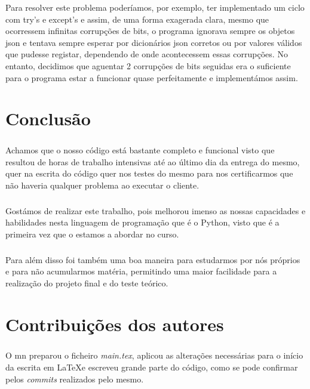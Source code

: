 \documentclass[a4paper]{report}
\begin{document}
Para resolver este problema poderíamos, por exemplo, ter implementado um ciclo com try's e except's e assim, de uma forma exagerada clara, mesmo que ocorressem infinitas corrupções de bits, o programa ignorava sempre os objetos \ac{json} e tentava sempre esperar por dicionários \ac{json} corretos ou por valores válidos que pudesse registar, dependendo de onde acontecessem essas corrupções.
No entanto, decidimos que aguentar 2 corrupções de bits seguidas era o suficiente para o programa estar a funcionar quase perfeitamente e implementámos assim.

\chapter{Conclusão}
\label{chap.conclusao}
\paragraph{}Achamos que o nosso código está bastante completo e funcional visto que resultou de horas de trabalho intensivas até ao último dia da entrega do mesmo, quer na escrita do código quer nos testes do mesmo para nos certificarmos que não haveria qualquer problema ao executar o cliente.

\paragraph{}Gostámos de realizar este trabalho, pois melhorou imenso as nossas capacidades e habilidades nesta linguagem de programação que é o Python, visto que é a primeira vez que o estamos a abordar no curso.

\paragraph{}Para além disso foi também uma boa maneira para estudarmos por nós próprios e para não acumularmos matéria, permitindo uma maior facilidade para a realização do projeto final e do teste teórico.

\chapter{Contribuições dos autores}
\paragraph{}O \ac{mn} preparou o ficheiro \textit{main.tex}, aplicou as alterações necessárias para o início da escrita em \LaTeX e escreveu grande parte do código, como se pode confirmar pelos \textit{commits} realizados pelo mesmo.
\end{document}
